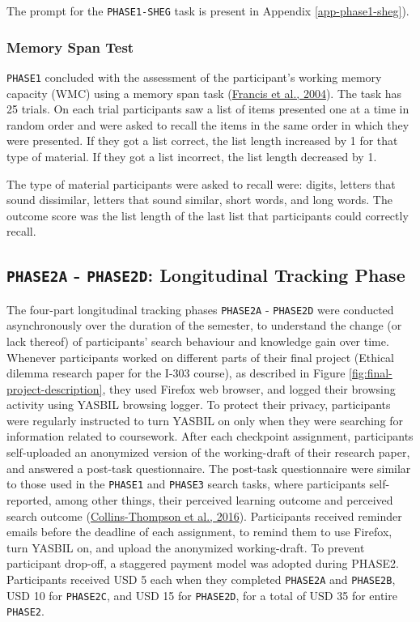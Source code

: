 \documentclass[letterpaper, nobind]{templates/ociamthesis}
\begin{document}
The prompt for the \texttt{PHASE1-SHEG} task is present in Appendix \ref{app-phase1-sheg}).

\hypertarget{memory-span-test}{%
\subsubsection{Memory Span Test}\label{memory-span-test}}

\texttt{PHASE1} concluded with the assessment of the participant's working memory capacity (WMC) using a memory span task (\protect\hyperlink{ref-francis2004coglab}{Francis et al., 2004}).
The task has 25 trials. On each trial participants saw a list of items presented one at a time in random order and were asked to recall the items in the same order in which they were presented. If they got a list correct, the list length increased by 1 for that type of material. If they got a list incorrect, the list length decreased by 1.

The type of material participants were asked to recall were: digits, letters that sound dissimilar, letters that sound similar, short words, and long words. The outcome score was the list length of the last list that participants could correctly recall.

\hypertarget{sec-method-phase2}{%
\subsection{\texorpdfstring{\texttt{PHASE2A} - \texttt{PHASE2D}: Longitudinal Tracking Phase}{PHASE2A - PHASE2D: Longitudinal Tracking Phase}}\label{sec-method-phase2}}

The four-part longitudinal tracking phases \texttt{PHASE2A} - \texttt{PHASE2D} were conducted asynchronously over the duration of the semester, to understand the change (or lack thereof) of participants' search behaviour and knowledge gain over time.
Whenever participants worked on different parts of their final project (Ethical dilemma research paper for the I-303 course), as described in Figure \ref{fig:final-project-description}, they used Firefox web browser, and logged their browsing activity using YASBIL browsing logger.
To protect their privacy, participants were regularly instructed to turn YASBIL on only when they were searching for information related to coursework.
After each checkpoint assignment, participants self-uploaded an anonymized version of the working-draft of their research paper, and answered a post-task questionnaire.
The post-task questionnaire were similar to those used in the \texttt{PHASE1} and \texttt{PHASE3} search tasks, where participants self-reported, among other things, their perceived learning outcome and perceived search outcome (\protect\hyperlink{ref-collins2016assessing}{Collins-Thompson et al., 2016}).
Participants received reminder emails before the deadline of each assignment, to remind them to use Firefox, turn YASBIL on, and upload the anonymized working-draft.
To prevent participant drop-off, a staggered payment model was adopted during PHASE2.
Participants received USD 5 each when they completed \texttt{PHASE2A} and \texttt{PHASE2B}, USD 10 for \texttt{PHASE2C}, and USD 15 for \texttt{PHASE2D}, for a total of USD 35 for entire \texttt{PHASE2}.
\end{document}
